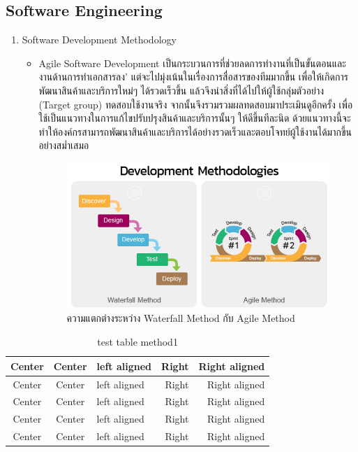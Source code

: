\documentclass[12pt,oneside,openright,a4paper]{cpe-thai-project}
\begin{document}
\subsection{Software Engineering}
\begin{enumerate}[label=\thesubsection.\arabic*,leftmargin=0pt,itemindent=2.5cm]
\item Software Development Methodology
	\begin{itemize}[leftmargin=0pt,itemindent=3cm]
		\item Agile Software Development เป็นกระบวนการที่ช่วยลดการทำงานที่เป็นขั้นตอนและงานด้านการทำเอกสารลง’ แต่จะไปมุ่งเน้นในเรื่องการสื่อสารของทีมมากขึ้น เพื่อให้เกิดการพัฒนาสินค้าและบริการใหม่ๆ ได้รวดเร็วขึ้น แล้วจึงนำสิ่งที่ได้ไปให้ผู้ใช้กลุ่มตัวอย่าง (Target group) ทดสอบใช้งานจริง จากนั้นจึงรวมรวมผลทดสอบมาประเมินดูอีกครั้ง เพื่อใช้เป็นแนวทางในการแก้ไขปรับปรุงสินค้าและบริการนั้นๆ ให้ดีขึ้นทีละนิด ด้วยแนวทางนี้จะทำให้องค์กรสามารถพัฒนาสินค้าและบริการได้อย่างรวดเร็วและตอบโจทย์ผู้ใช้งานได้มากขึ้นอย่างสม่ำเสมอ
	\begin{figure}
	\centering
	\includegraphics[scale=0.6]{agile}
	\caption{ความแตกต่างระหว่าง Waterfall Method กับ Agile Method}
	\end{figure}
	\end{itemize}
\end{enumerate}





\begin{table}[!h]
\caption{test table method1}\label{tbl:method1}
\begin{tabular}{c|c|l|rr} \hline\hline
Center & Center & left aligned & Right & Right aligned \\ \hline\hline
Center & Center & left aligned & Right & Right aligned \\ \hline
Center & Center & left aligned & Right & Right aligned \\ 
Center & Center & left aligned & Right & Right aligned \\ \hline
Center & Center & left aligned & Right & Right aligned \\ \hline\hline
\end{tabular}
\end{table}
\end{document}
